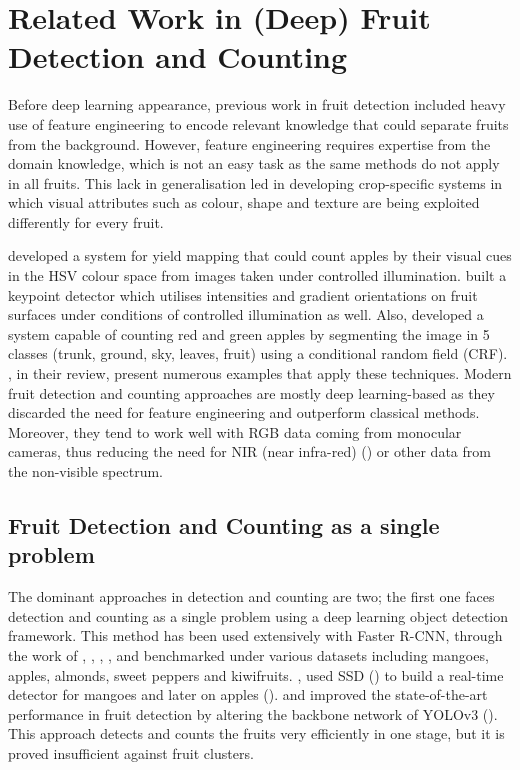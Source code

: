 \section{Related Work in (Deep) Fruit Detection and Counting}
Before deep learning appearance, previous work in fruit detection included heavy use of feature engineering to encode relevant knowledge that could separate fruits from the background. However, feature engineering requires expertise from the domain knowledge, which is not an easy task as the same methods do not apply in all fruits. This lack in generalisation led in developing crop-specific systems in which visual attributes such as colour, shape and texture are being exploited differently for every fruit.

\cite{wang2013automated} developed a system for yield mapping that could count apples by their visual cues in the HSV colour space from images taken under controlled illumination. \cite{pothen2016texture} built a keypoint detector which utilises intensities and gradient orientations on fruit surfaces under conditions of controlled illumination as well. Also, \cite{hung2015feature} developed a system capable of counting red and green apples by segmenting the image in 5 classes (trunk, ground, sky, leaves, fruit) using a conditional random field (CRF). \cite{gongal2015sensors}, in their review, present numerous examples that apply these techniques. Modern fruit detection and counting approaches are mostly deep learning-based as they discarded the need for feature engineering and outperform classical methods. Moreover, they tend to work well with RGB data coming from monocular cameras, thus reducing the need for NIR (near infra-red) (\cite{hung2013orchard}) or other data from the non-visible spectrum.

\subsection{Fruit Detection and Counting as a single problem}
The dominant approaches in detection and counting are two; the first one faces detection and counting as a single problem using a deep learning object detection framework. This method has been used extensively with Faster R-CNN, through the work of \cite{bargoti2017deep}, \cite{sa2016deepfruits}, \cite{mai2018faster}, \cite{fu2018kiwifruit}, \cite{gene2019multi} and benchmarked under various datasets including mangoes, apples, almonds, sweet peppers and kiwifruits. \cite{liang2018real}, used SSD (\cite{liu2016ssd}) to build a real-time detector for mangoes and later on apples (\cite{liang2018apple}). \cite{tian2019apple} and \cite{koirala2019deep} improved the state-of-the-art performance in fruit detection by altering the backbone network of YOLOv3 (\cite{redmon2018yolov3}). This approach detects and counts the fruits very efficiently in one stage, but it is proved insufficient against fruit clusters. 

